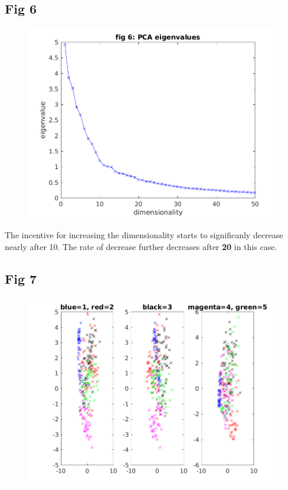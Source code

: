 \documentclass{article}
\begin{document}
\subsection{Fig 6}
\begin{figure}[h!]
\begin{center}
\includegraphics[width=1\columnwidth]{RunResults2/6.png}
\label{6}
\end{center}
\end{figure} 
The incentive for increasing the dimensionality starts to significanly decrease nearly after 10. The rate of decrease further decreases after \textbf{20} in this case.
\newpage
\subsection{ Fig 7}
\begin{figure}[h!]
\begin{center}
\includegraphics[width=0.5\columnwidth]{RunResults2/7.png}
\label{7}
\end{center}
\end{figure}
\end{document}

